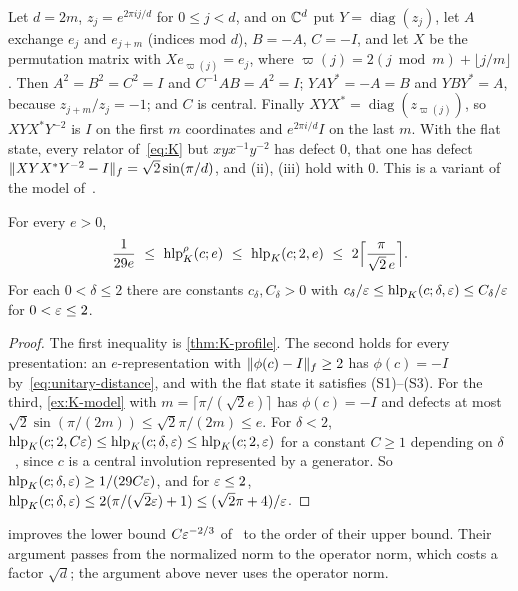 \begin{example}[A model]\label{ex:K-model}
Let $d=2m$, $z_j=e^{2\pi ij/d}$ for $0\le j<d$, and on $\mathbb C^d$ put $Y=\operatorname{diag}(z_j)$, let $A$ exchange $e_j$ and $e_{j+m}$
(indices mod $d$), $B=-A$, $C=-I$, and let $X$ be the permutation matrix with $Xe_{\varpi(j)}=e_j$, where $\varpi(j)=2(j\bmod m)+\lfloor
j/m\rfloor$. Then $A^2=B^2=C^2=I$ and $C^{-1}AB=A^2=I$; $YAY^*=-A=B$ and $YBY^*=A$, because $z_{j+m}/z_j=-1$; and $C$ is central. Finally
$XYX^*=\operatorname{diag}(z_{\varpi(j)})$, so $XYX^*Y^{-2}$ is $I$ on the first $m$ coordinates and $e^{2\pi i/d}I$ on the last $m$. With
the flat state, every relator of~\eqref{eq:K} but $xyx^{-1}y^{-2}$ has defect $0$, that one has defect
$\lVert XYX^*Y^{-2}-I\rVert_f=\sqrt2\sin(\pi/d)$, and (ii), (iii) hold with $0$. This is a variant of the model of~\cite[Lemma~3.8]{SV18}.
\end{example}

\begin{corollary}\label{cor:K-profile}
For every $e>0$,
\[
\frac1{29e}\ \le\ \hlps_K(c;e)\ \le\ \hlp_K(c;2,e)\ \le\ 2\Bigl\lceil\frac\pi{\sqrt2\,e}\Bigr\rceil .
\]
For each $0<\delta\le2$ there are constants $c_\delta,C_\delta>0$ with $c_\delta/\varepsilon\le\operatorname{hlp}_K(c;\delta,\varepsilon)\le C_\delta/\varepsilon$ for
$0<\varepsilon\le2$.
\end{corollary}

\begin{proof}
The first inequality is \cref{thm:K-profile}. The second holds for every presentation: an $e$-representation with $\lVert \phi(c)-I\rVert_f\ge2$ has
$\phi(c)=-I$ by~\eqref{eq:unitary-distance}, and with the flat state it satisfies (S1)--(S3). For the third, \cref{ex:K-model} with
$m=\lceil\pi/(\sqrt2e)\rceil$ has $\phi(c)=-I$ and defects at most $\sqrt2\sin(\pi/(2m))\le\sqrt2\pi/(2m)\le e$. For $\delta<2$,
$\operatorname{hlp}_K(c;2,C\varepsilon)\le\operatorname{hlp}_K(c;\delta,\varepsilon)\le\operatorname{hlp}_K(c;2,\varepsilon)$ for a constant $C\ge1$ depending on $\delta$~\cite[Proposition~2.7]{SV18},
since $c$ is a central involution represented by a generator. So $\operatorname{hlp}_K(c;\delta,\varepsilon)\ge1/(29C\varepsilon)$, and for $\varepsilon\le2$,
$\operatorname{hlp}_K(c;\delta,\varepsilon)\le2(\pi/(\sqrt2\varepsilon)+1)\le(\sqrt2\pi+4)/\varepsilon$.
\end{proof}

 improves the lower bound $C\varepsilon^{-2/3}$ of~\cite[Lemma~3.5 and Proposition~3.2]{SV18} to the order of their upper
bound. Their argument passes from the normalized norm to the operator norm, which costs a factor $\sqrt d$; the argument above never uses
the operator norm.

